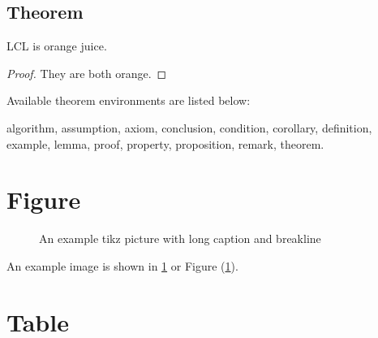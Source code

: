 \subsection{Theorem}

\begin{definition}
  LCL is orange juice.
\end{definition}

\begin{proof}
  They are both orange.
\end{proof}

Available theorem environments are listed below:

algorithm, assumption, axiom, conclusion, condition, corollary, definition, example, lemma, proof, property, proposition, remark, theorem.


\section{Figure}

\begin{figure}[H]
  \caption{An example tikz picture with long caption and breakline\\\blindtext}
  \label{fig:tikz example}
\end{figure}

An example image is shown in \cref{fig:tikz example} or Figure (\ref{fig:tikz example}).

\section{Table}

